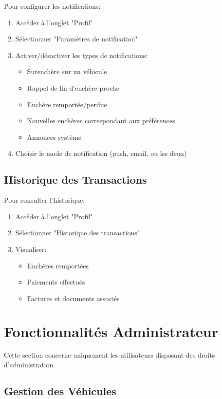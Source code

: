 Pour configurer les notifications:

\begin{enumerate}
    \item Accéder à l'onglet "Profil"
    \item Sélectionner "Paramètres de notification"
    \item Activer/désactiver les types de notifications:
    \begin{itemize}
        \item Surenchère sur un véhicule
        \item Rappel de fin d'enchère proche
        \item Enchère remportée/perdue
        \item Nouvelles enchères correspondant aux préférences
        \item Annonces système
    \end{itemize}
    \item Choisir le mode de notification (push, email, ou les deux)
\end{enumerate}

\subsection{Historique des Transactions}

Pour consulter l'historique:

\begin{enumerate}
    \item Accéder à l'onglet "Profil"
    \item Sélectionner "Historique des transactions"
    \item Visualiser:
    \begin{itemize}
        \item Enchères remportées
        \item Paiements effectués
        \item Factures et documents associés
    \end{itemize}
\end{enumerate}

\section{Fonctionnalités Administrateur}

Cette section concerne uniquement les utilisateurs disposant des droits d'administration.

\subsection{Gestion des Véhicules}

